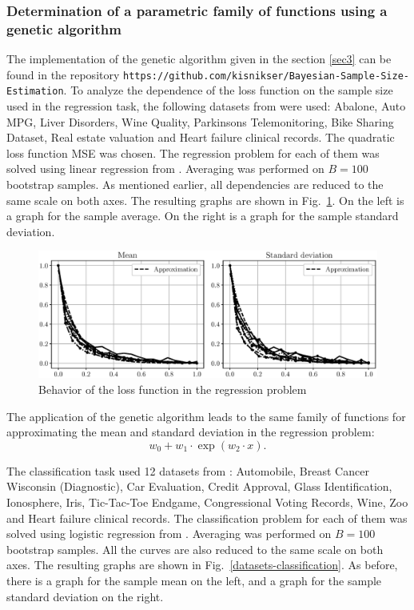 \documentclass[
11pt,%
tightenlines,%
twoside,%
onecolumn,%
nofloats,%
nobibnotes,%
nofootinbib,%
superscriptaddress,%
noshowpacs,%
centertags]%
{revtex4-2}
\begin{document}
\subsubsection{Determination of a parametric family of functions using a genetic algorithm}

The implementation of the genetic algorithm given in the section \ref{sec3} can be found in the repository \texttt{https://github.com/kisnikser/Bayesian-Sample-Size-Estimation}. To analyze the dependence of the loss function on the sample size used in the regression task, the following datasets from \citep{UCI} were used: Abalone, Auto MPG, Liver Disorders, Wine Quality, Parkinsons Telemonitoring, Bike Sharing Dataset, Real estate valuation and Heart failure clinical records. The quadratic loss function MSE was chosen. The regression problem for each of them was solved using linear regression from \citep{scikit-learn}. Averaging was performed on $B = 100$ bootstrap samples. As mentioned earlier, all dependencies are reduced to the same scale on both axes. The resulting graphs are shown in Fig.~\ref{datasets-regression}. On the left is a graph for the sample average. On the right is a graph for the sample standard deviation.

\begin{figure}[h!]
    \centering
    \includegraphics[width=\textwidth]{../paper/figures/gray/eps/datasets-regression}
    \caption{Behavior of the loss function in the regression problem}
    \label{datasets-regression}
\end{figure}

The application of the genetic algorithm leads to the same family of functions for approximating the mean and standard deviation in the regression problem:
\[ w_0 + w_1 \cdot \exp(w_2 \cdot x). \]

The classification task used 12 datasets from \citep{UCI}: Automobile, Breast Cancer Wisconsin (Diagnostic), Car Evaluation, Credit Approval, Glass Identification, Ionosphere, Iris, Tic-Tac-Toe Endgame, Congressional Voting Records, Wine, Zoo and Heart failure clinical records. The classification problem for each of them was solved using logistic regression from \citep{scikit-learn}. Averaging was performed on $B = 100$ bootstrap samples. All the curves are also reduced to the same scale on both axes. The resulting graphs are shown in Fig.~\ref{datasets-classification}. As before, there is a graph for the sample mean on the left, and a graph for the sample standard deviation on the right.
\end{document}
